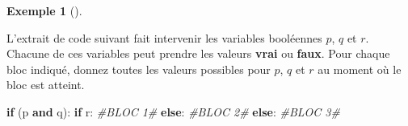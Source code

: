 \documentclass[
  letterpaper,
]{scrbook}
\newenvironment{Shaded}{\begin{snugshade}}{\end{snugshade}}
\newcommand{\CommentTok}[1]{\textcolor[rgb]{0.38,0.63,0.69}{\textit{#1}}}
\newcommand{\ControlFlowTok}[1]{\textcolor[rgb]{0.00,0.44,0.13}{\textbf{#1}}}
\newcommand{\KeywordTok}[1]{\textcolor[rgb]{0.00,0.44,0.13}{\textbf{#1}}}
\newcommand{\NormalTok}[1]{\textcolor[rgb]{0.00,0.44,0.13}{#1}}
\theoremstyle{plain}
\theoremstyle{definition}
\theoremstyle{definition}
\newtheorem{example}{Exemple}[chapter]
\theoremstyle{remark}
\begin{document}
\begin{example}[]\protect\hypertarget{exm-bloc-code}{}\label{exm-bloc-code}

L'extrait de code suivant fait intervenir les variables booléennes
\(p\), \(q\) et \(r\). Chacune de ces variables peut prendre les valeurs
\textbf{vrai} ou \textbf{faux}. Pour chaque bloc indiqué, donnez toutes
les valeurs possibles pour \(p\), \(q\) et \(r\) au moment où le bloc
est atteint.

\hypertarget{bloc-code-python}{}
\begin{Shaded}
\begin{Highlighting}[]
\ControlFlowTok{if}\NormalTok{ (p }\KeywordTok{and}\NormalTok{ q):}
    \ControlFlowTok{if}\NormalTok{ r:}
        \CommentTok{\#BLOC 1\#}
    \ControlFlowTok{else}\NormalTok{:}
        \CommentTok{\#BLOC 2\#}
\ControlFlowTok{else}\NormalTok{:}
    \CommentTok{\#BLOC 3\#}
\end{Highlighting}
\end{Shaded}


\end{example}
\end{document}
